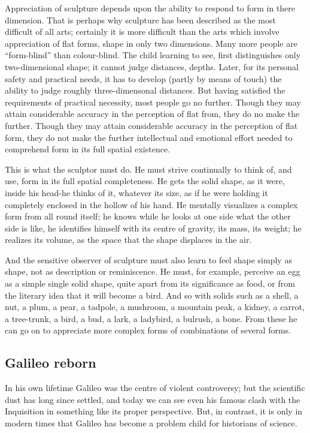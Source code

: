 \documentclass[11pt]{article}
\begin{document}
Appreciation of sculpture depends upon the ability to respond to form in there dimension. That is perhaps why sculpture has been described as the most difficult of all arts; certainly it is more difficult than the arts which involve appreciation of flat forms, shape in only two dimensions. Many more people are ``form-blind'' than colour-blind. The child learning to see, first distinguishes only two-dimensional shape; it cannot judge distances, depths. Later, for its personal safety and practical needs, it has to develop (partly by means of touch) the ability to judge roughly three-dimensonal distances. But having satisfied the requirements of practical necessity, most people go no further. Though they may attain considerable accuracy in the perception of flat from, they do no make the further. Though they may attain considerable accuracy in the perception of flat form, they do not make the further intellectual and emotional effort needed to comprehend form in its full spatial existence.

This is what the sculptor must do. He must strive continually to think of, and use, form in its full spatial completeness. He gets the solid shape, as it were, inside his head-he thinks of it, whatever its size, as if he were holding it completely enclosed in the hollow of his hand. He mentally visualizes a complex form from all round itself; he knows while he looks at one side what the other side is like, he identifies himself with its centre of gravity, its mass, its weight; he realizes its volume, as the space that the shape displaces in the air.

And the sensitive observer of sculpture must also learn to feel shape simply as shape, not as description or reminiscence. He must, for example, perceive an egg as a simple single solid shape, quite apart from its significance as food, or from the literary idea that it will become a bird. And so with solids such as a shell, a nut, a plum, a pear, a tadpole, a mushroom, a mountain peak, a kidney, a carrot, a tree-trunk, a bird, a bud, a lark, a ladybird, a bulrush, a bone. From these he can go on to appreciate more complex forms of combinations of several forms.
\subsection{Galileo reborn}
\label{sec-2-32}

In his own lifetime Galileo was the centre of violent controversy; but the scientific dust has long since settled, and today we can see even his famous clash with the Inquisition in something like its proper perspective. But, in contrast, it is only in modern times that Galileo has become a problem child for historians of science.
\end{document}
